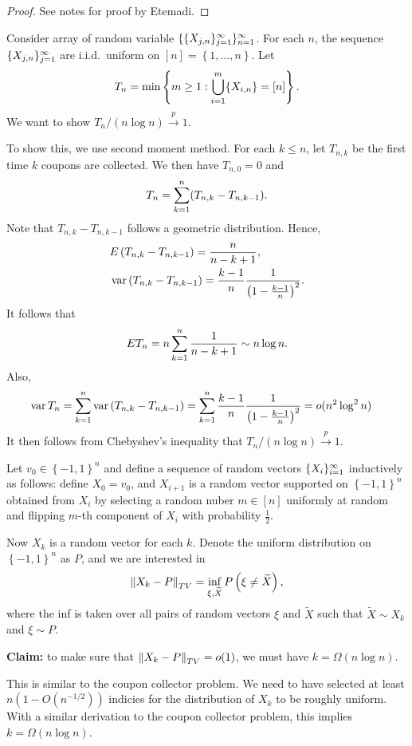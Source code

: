 \documentclass[a4paper]{article}
\newcommand{\convp}{\xrightarrow{p}}
\begin{document}
\begin{proof}
  See notes for proof by Etemadi.
\end{proof}

\begin{eg}
  Consider array of random variable $\{ \{ X_{j, n} \}_{j=1}^\infty \}_{n=1}^\infty$. 
  For each $n$, the sequence $\{ X_{j, n} \}_{j=1}^\infty$
  are i.i.d.\ uniform on $[n] = \left\{ 1, \dots, n \right\}$.
  Let 
  \[
  T_n = \min \left\{ m \geq 1 : \bigcup_{i=1}^m \{X_{i, n}\} = [n] \right\}.
  \]
  We want to show $T_n / (n \log n) \convp 1$.

  To show this, we use second moment method.
  For each $k \leq n$, let $T_{n, k}$ be the first time $k$ coupons 
  are collected. We then have $T_{n, 0} = 0$ and 
  \[
  T_n = \sum_{k=1}^n (T_{n, k} - T_{n, k - 1}).
  \]
  Note that $T_{n, k} - T_{n, k - 1}$ follows a geometric distribution.
  Hence,
  \begin{align*}
    &E \left( T_{n, k} - T_{n, k - 1} \right) = \frac{n}{n - k + 1}, \\
    &\operatorname{var} \left( T_{n, k} - T_{n, k - 1} \right) =  
    \frac{k - 1}{n} \frac{1}{\left( 1 - \frac{k - 1}{n} \right)^2}.
  \end{align*}
  It follows that 
  \[
  E T_n = n \sum_{k=1}^n \frac{1}{n - k + 1} \sim n \log n.
  \]
  Also, 
  \begin{align*}
    \operatorname{var} T_n 
    &= \sum_{k=1}^n \operatorname{var} \left( T_{n, k} - T_{n, k - 1} \right)
    = \sum_{k=1}^n \frac{k - 1}{n} \frac{1}{\left( 1 - \frac{k - 1}{n} \right)^2}
    = o(n^2 \log^2 n)
  \end{align*}
  It then follows from Chebyshev's inequality that 
  $T_n / (n \log n) \convp 1$.

\end{eg}

\begin{eg}
  Let $v_0 \in \left\{ -1, 1 \right\}^n$ and define a sequence 
  of random vectors $\{ X_i \}_{i=1}^\infty$ inductively as follows:
  define $X_0 = v_0$, and $X_{i + 1}$ is a random vector supported 
  on $\left\{ -1, 1 \right\}^n$ obtained from $X_i$ by selecting 
  a random nuber $m \in [n]$ uniformly at random and flipping 
  $m$-th component of $X_i$ with probability $\frac{1}{2}$.

  Now $X_k$ is a random vector for each $k$. 
  Denote the uniform distribution on $\left\{ -1, 1 \right\}^n$ 
  as $P$, and we are interested in 
  \[
  \left\lVert X_k - P\right\rVert_{TV} 
  = \inf_{\xi, \widetilde{X}} P \left( \xi \neq \widetilde{X} \right),
  \]
  where the inf is taken over all pairs of random vectors 
  $\xi$ and $\tilde{X}$ such that $\tilde{X} \sim X_k$ and 
  $\xi \sim P$.

  \textbf{Claim:} to make sure that $\left\lVert X_k - P\right\rVert_{TV} = o(1)$,
  we must have $k = \Omega (n \log n)$. 
  
  This is similar to the coupon collector problem. We need to have selected 
  at least $n (1 - O( n^{-1/2} ))$ indicies for the distribution 
  of $X_k$ to be roughly uniform. With a similar derivation 
  to the coupon collector problem, this implies $k = \Omega (n \log n)$.


\end{eg}
\end{document}
